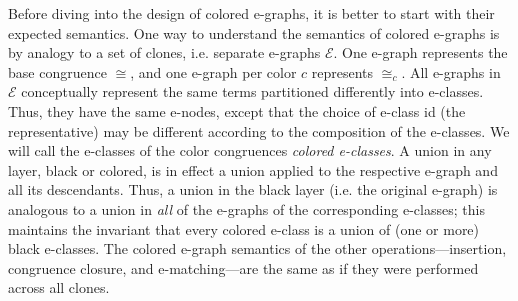 Before diving into the design of colored e-graphs, it is better to start with their expected semantics.
One way to understand the semantics of colored e-graphs is by analogy to a set of clones, i.e. separate e-graphs $\mathcal{E}$.
One e-graph represents the base congruence $\cong$,
and one e-graph per color $c$ represents $\cong_c$.
All e-graphs in $\mathcal{E}$ conceptually represent the same terms partitioned differently into e-classes.
Thus, they have the same e-nodes, except that the choice of e-class id (the representative) may be different according to the composition of the e-classes.
We will call the e-classes of the color congruences \emph{colored e-classes}.
A union in any layer, black or colored, is in effect a union applied to the respective e-graph and all its descendants. 
Thus, a union in the black layer (i.e. the original e-graph) is analogous to a union in \emph{all} of the e-graphs of the corresponding e-classes;
this maintains the invariant that every colored e-class is a union of (one or more) black e-classes.
The colored e-graph semantics of the other operations---insertion, congruence closure, and e-matching---are the same as if they were performed across all clones.

\begin{comment}
Using a set of e-graphs is very similar to what TheSy does.
But, this set of e-graphs approach proves to be inefficient in exploratory reasoning tasks. 
The main issue is that with each e-graph consisting of its own hash-cons, union-find, and e-class map, the memory consumption will be significant.
However, in some cases a separate e-graph could be quite efficient.
An extreme (but not uncommon) case is when an e-graph becomes inconsistent, which can be when \eg $\ttrue$ is union-ed with $\tfalse$.
This can lead to many e-classes representing Boolean expressions being union-ed, and as a side effect, requiring much fewer e-nodes.
For example $\ttrue \land \ttrue$, $\ttrue \land \tfalse$, $\tfalse \land \ttrue$, and $\tfalse \land \tfalse$ will all be represented by the same e-node $[\ttrue] \land [\ttrue]$.
In this case, when the e-graph rebuilds it will minimize itself.
The e-graph memory footprint could actually be as small as the size of the union-find plus a constant amount of e-nodes.\SI{I am a bit unsure about how `constant' this amount is; still sounds polynomial in the number of e-classes}
\end{comment}

